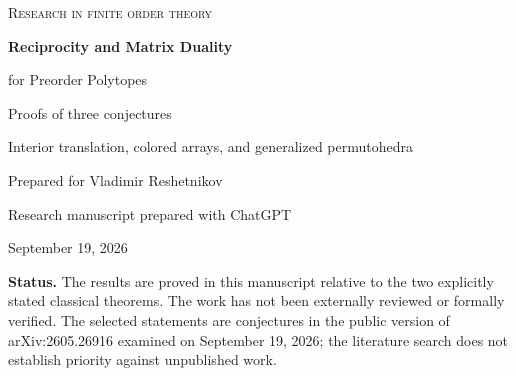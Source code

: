 \documentclass[11pt,letterpaper]{article}
\theoremstyle{definition}
\begin{document}
\begin{titlepage}
\thispagestyle{empty}
{\color{Teal}\large\textsc{Research in finite order theory}}\par
\vspace{1.05cm}
{\color{InkBlue}\Huge\bfseries Reciprocity and Matrix Duality\par
\vspace{0.15cm}for Preorder Polytopes\par}
\vspace{0.65cm}
{\Large Proofs of three conjectures\par}
\vspace{0.25cm}
{\large Interior translation, colored arrays, and generalized permutohedra\par}
\vspace{1.0cm}
{\large Prepared for Vladimir Reshetnikov\par}
{\normalsize Research manuscript prepared with ChatGPT\par}
{\normalsize September 19, 2026\par}
\vspace{0.9cm}
\begin{abstract}
We investigate conjectures on the polytopes attached to finite preorders by
Athanasiadis and Chapoton. The central observation is that subtracting the
all-ones vector identifies the interior lattice points of their two-parameter
polytope with the lattice points obtained by decreasing both parameters by one.
Ordinary Ehrhart--Macdonald reciprocity along integer rays then proves their
Conjecture~7.2. We establish an $(n+1)$-parameter strengthening and a second,
falling-binomial formula for the lattice enumerator. This proves their
Conjecture~4.4 on the $h^*$-polynomial and the ordinary, $q=1$ specialization of
Conjecture~4.9.

A separate construction replaces the two color classes of the preorder's
bipartite graph by independently prescribed numbers of copies. Postnikov's
lattice-point formula yields a heterogeneous array duality, which specializes
to the matrix Ehrhart--zeta duality of Conjecture~4.2. Detailed proofs, examples,
sign and boundary checks, and an exact-arithmetic verification program are
provided. The program checks every labeled preorder on one through four
elements. No conjectured shellability or real-rootedness is used.
\end{abstract}
\vfill
\begin{resultbox}
\textbf{Status.} The results are proved in this manuscript relative to the two
explicitly stated classical theorems. The work has not been externally reviewed
or formally verified. The selected statements are conjectures in the public
version of arXiv:2605.26916 examined on September 19, 2026; the literature search
does not establish priority against unpublished work.
\end{resultbox}
\end{titlepage}
\end{document}
